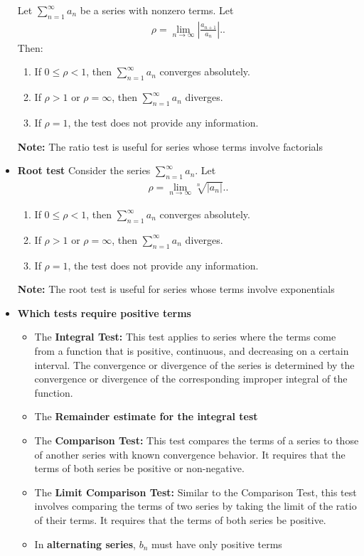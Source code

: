\documentclass{report}
\begin{document}
\begin{itemize}
    Let \(\sum_{n=1}^{\infty} a_n\) be a series with nonzero terms. Let
    \begin{align*}
        \rho = \lim_{n \to \infty} \left| \frac{a_{n+1}}{a_n} \right|.
    .\end{align*}
    Then:
    \begin{enumerate}[label=\roman*.]
        \item If \(0 \leq \rho < 1\), then \(\sum_{n=1}^{\infty} a_n\) converges absolutely.
        \item If \(\rho > 1\) or \(\rho = \infty\), then \(\sum_{n=1}^{\infty} a_n\) diverges.
        \item If \(\rho = 1\), the test does not provide any information.
    \end{enumerate}
    \bigbreak \noindent 
    \textbf{Note:} The ratio test is useful for series whose terms involve factorials
\item \textbf{Root test}
    Consider the series \(\sum_{n=1}^{\infty} a_n\). Let
    \begin{align*}
        \rho = \lim_{n \to \infty} \sqrt[n]{|a_n|}.
    .\end{align*}
    \begin{enumerate}[label=\roman*.]
        \item If \(0 \leq \rho < 1\), then \(\sum_{n=1}^{\infty} a_n\) converges absolutely. 
        \item If \(\rho > 1\) or \(\rho = \infty\), then \(\sum_{n=1}^{\infty} a_n\) diverges. 
        \item If \(\rho = 1\), the test does not provide any information.
    \end{enumerate}
    \bigbreak \noindent 
    \textbf{Note:} The root test is useful for series whose terms involve exponentials
\item \textbf{Which tests require positive terms}
    \begin{itemize}
        \item The \textbf{Integral Test:} This test applies to series where the terms come from a function that is positive, continuous, and decreasing on a certain interval. The convergence or divergence of the series is determined by the convergence or divergence of the corresponding improper integral of the function.
        \item The \textbf{Remainder estimate for the integral test}
        \item The \textbf{Comparison Test:} This test compares the terms of a series to those of another series with known convergence behavior. It requires that the terms of both series be positive or non-negative.
        \item The \textbf{Limit Comparison Test:} Similar to the Comparison Test, this test involves comparing the terms of two series by taking the limit of the ratio of their terms. It requires that the terms of both series be positive.
        \item In \textbf{alternating series}, $b_{n}$ must have only positive terms
    \end{itemize}
\end{itemize}
\end{document}
